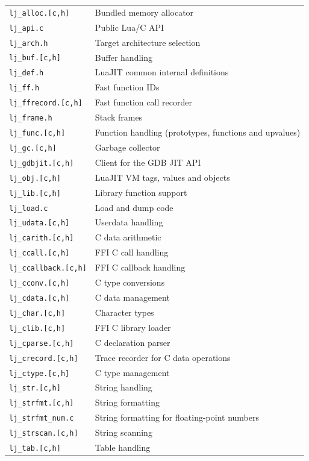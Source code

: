 \begin{center}
\begin{longtable}{|p{4cm}|p{9cm}|}
\texttt{lj\_alloc.[c,h]} & Bundled memory allocator\\
\texttt{lj\_api.c} & Public Lua/C API\\
\texttt{lj\_arch.h} & Target architecture selection\\
\texttt{lj\_buf.[c,h]} & Buffer handling\\
\texttt{lj\_def.h} & LuaJIT common internal definitions\\
\texttt{lj\_ff.h} & Fast function IDs\\
\texttt{lj\_ffrecord.[c,h]} & Fast function call recorder\\
\texttt{lj\_frame.h} & Stack frames\\
\texttt{lj\_func.[c,h]} & Function handling (prototypes, functions and upvalues)\\
\texttt{lj\_gc.[c,h]} & Garbage collector\\
\texttt{lj\_gdbjit.[c,h]} & Client for the GDB JIT API\\
\texttt{lj\_obj.[c,h]} & LuaJIT VM tags, values and objects\\
\texttt{lj\_lib.[c,h]} & Library function support\\
\texttt{lj\_load.c} & Load and dump code\\
\texttt{lj\_udata.[c,h]} & Userdata handling\\


\hline

\texttt{lj\_carith.[c,h]} & C data arithmetic\\
\texttt{lj\_ccall.[c,h]} & FFI C call handling\\
\texttt{lj\_ccallback.[c,h]} & FFI C callback handling\\
\texttt{lj\_cconv.[c,h]} & C type conversions\\
\texttt{lj\_cdata.[c,h]} & C data management\\
\texttt{lj\_char.[c,h]} & Character types\\
\texttt{lj\_clib.[c,h]} & FFI C library loader\\
\texttt{lj\_cparse.[c,h]} & C declaration parser\\
\texttt{lj\_crecord.[c,h]} & Trace recorder for C data operations\\
\texttt{lj\_ctype.[c,h]} & C type management\\

\hline


\texttt{lj\_str.[c,h]} & String handling\\
\texttt{lj\_strfmt.[c,h]} & String formatting\\
\texttt{lj\_strfmt\_num.c} & String formatting for floating-point numbers\\
\texttt{lj\_strscan.[c,h]} & String scanning\\
\texttt{lj\_tab.[c,h]} & Table handling\\


\end{longtable}
\end{center}
